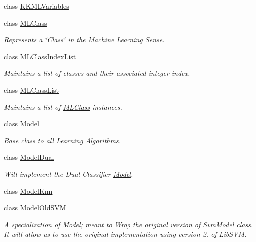 \begin{DoxyCompactItemize}
\item 
class \hyperlink{class_k_k_m_l_l_1_1_k_k_m_l_variables}{K\+K\+M\+L\+Variables}
\item 
class \hyperlink{class_k_k_m_l_l_1_1_m_l_class}{M\+L\+Class}
\begin{DoxyCompactList}\small\item\em Represents a \char`\"{}\+Class\char`\"{} in the Machine Learning Sense. \end{DoxyCompactList}\item 
class \hyperlink{class_k_k_m_l_l_1_1_m_l_class_index_list}{M\+L\+Class\+Index\+List}
\begin{DoxyCompactList}\small\item\em Maintains a list of classes and their associated integer index. \end{DoxyCompactList}\item 
class \hyperlink{class_k_k_m_l_l_1_1_m_l_class_list}{M\+L\+Class\+List}
\begin{DoxyCompactList}\small\item\em Maintains a list of \hyperlink{class_k_k_m_l_l_1_1_m_l_class}{M\+L\+Class} instances. \end{DoxyCompactList}\item 
class \hyperlink{class_k_k_m_l_l_1_1_model}{Model}
\begin{DoxyCompactList}\small\item\em Base class to all Learning Algorithms. \end{DoxyCompactList}\item 
class \hyperlink{class_k_k_m_l_l_1_1_model_dual}{Model\+Dual}
\begin{DoxyCompactList}\small\item\em Will implement the Dual Classifier \hyperlink{class_k_k_m_l_l_1_1_model}{Model}. \end{DoxyCompactList}\item 
class \hyperlink{class_k_k_m_l_l_1_1_model_knn}{Model\+Knn}
\item 
class \hyperlink{class_k_k_m_l_l_1_1_model_old_s_v_m}{Model\+Old\+S\+VM}
\begin{DoxyCompactList}\small\item\em A specialization of \textquotesingle{}\hyperlink{class_k_k_m_l_l_1_1_model}{Model}\textquotesingle{}; meant to Wrap the original version of \textquotesingle{}Svm\+Model\textquotesingle{} class. It will allow us to use the original implementation using version 2. of Lib\+S\+VM. \end{DoxyCompactList}\item 

\end{DoxyCompactItemize}
